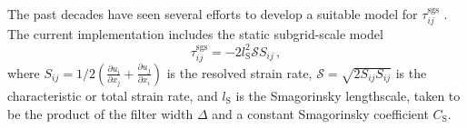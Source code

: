\documentclass[gmd, manuscript]{copernicus}
\begin{document}
The past decades have seen several efforts to develop a suitable model for \(\tau_{ij}^\mathrm{sgs}\) \citep{Smagorinsky1963, Schumann1975, BardinaFerzigerReynolds1980, Germano+1991, MeneveauLundCabot1996, PorteAgelMeneveauParlange2000, BouZeidMeneveauParlange2005}.
The current implementation includes the static \citet{Smagorinsky1963} subgrid-scale model
\begin{equation}
  \tau_{ij}^\mathrm{sgs} =
  - 2 l_\mathrm{S}^2 \mathcal{S} S_{ij}
  \,,
\end{equation}
where \(S_{ij} = 1/2 \left( \frac{\partial u_i}{\partial x_j} + \frac{\partial u_j}{\partial x_i} \right)\) is the resolved strain rate, \(\mathcal{S} = \sqrt{2 S_{ij} S_{ij}}\) is the characteristic or total strain rate, and \(l_\mathrm{S}\) is the Smagorinsky lengthscale, taken to be the product of the filter width \(\Delta\) and a constant Smagorinsky coefficient \(C_\mathrm{S}\).
\end{document}
